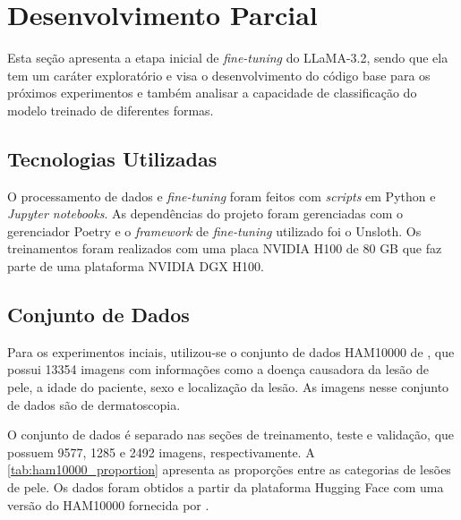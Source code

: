 \chapter{Desenvolvimento Parcial} %

Esta seção apresenta a etapa inicial de \textit{fine-tuning} do \ac{LLaMA}-3.2, sendo que ela tem um caráter exploratório e visa o desenvolvimento do código base para
os próximos experimentos e também analisar a capacidade de classificação do modelo treinado de diferentes formas.

\section{Tecnologias Utilizadas}

O processamento de dados e \textit{fine-tuning} foram feitos com \textit{scripts} em Python e \textit{Jupyter notebooks}. As dependências do projeto foram gerenciadas
com o gerenciador Poetry e o \textit{framework} de \textit{fine-tuning} utilizado foi o Unsloth. Os treinamentos foram realizados com uma placa NVIDIA H100 de 80 GB que
faz parte de uma plataforma NVIDIA DGX H100.

\section{Conjunto de Dados}

Para os experimentos inciais, utilizou-se o conjunto de dados \ac{HAM10000} de \textcite{tschandl2018ham10000}, que possui 13354 imagens com informações como a doença
causadora da lesão de pele, a idade do paciente, sexo e localização da lesão. As imagens nesse conjunto de dados são de dermatoscopia.

O conjunto de dados é separado nas seções de treinamento, teste e validação, que possuem 9577, 1285 e 2492 imagens, respectivamente. A \autoref{tab:ham10000_proportion}
apresenta as proporções entre as categorias de lesões de pele. Os dados foram obtidos a partir da plataforma Hugging Face com uma versão do \ac{HAM10000} fornecida por
\textcite{skin_cancer_dataset}.

